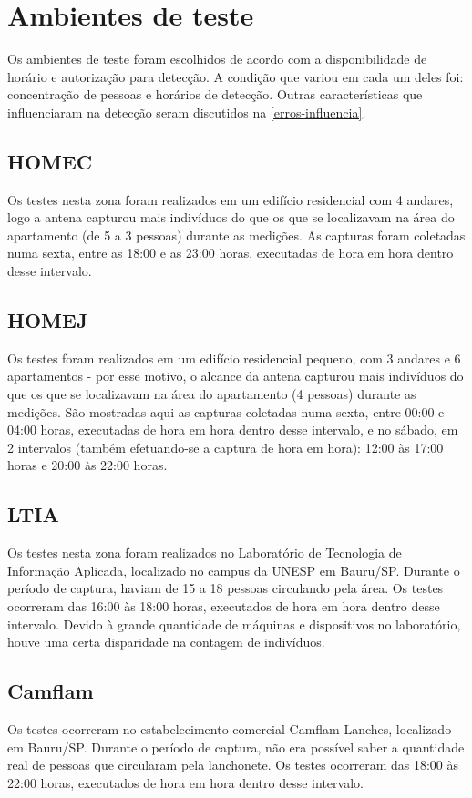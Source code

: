 \section{Ambientes de teste}
Os ambientes de teste foram escolhidos de acordo com a disponibilidade de horário e autorização
para detecção. A condição que variou em cada um deles foi: concentração de pessoas e horários de detecção.
Outras características que influenciaram na detecção seram discutidos na \autoref{erros-influencia}.

\subsection{HOMEC}

Os testes nesta zona foram realizados em um edifício residencial com 4
andares, logo a antena capturou mais indivíduos do que os que se localizavam na área do apartamento (de  5 a 3 pessoas) durante as medições. As capturas foram coletadas numa sexta, entre
as 18:00 e as 23:00 horas, executadas de hora em hora dentro desse intervalo.

\subsection{HOMEJ}
Os testes foram realizados em um edifício residencial pequeno, com 3
andares e 6 apartamentos - por esse motivo, o alcance da antena capturou mais
indivíduos do que os que se localizavam na área do apartamento (4 pessoas)
durante as medições. São mostradas aqui as capturas coletadas numa sexta, entre
00:00 e 04:00 horas, executadas de hora em hora dentro desse intervalo, e no
sábado, em 2 intervalos (também efetuando-se a captura de hora em hora): 12:00
às 17:00 horas e 20:00 às 22:00 horas.

\subsection{LTIA}
Os testes nesta zona foram realizados no Laboratório de Tecnologia de Informação Aplicada, localizado no campus da UNESP em Bauru/SP. Durante o período de captura, haviam de 15 a 18 pessoas circulando pela área.  Os testes ocorreram das 16:00 às 18:00 horas, executados de hora em hora dentro desse intervalo. Devido à grande quantidade de máquinas e dispositivos no laboratório, houve uma certa disparidade na contagem de indivíduos.

\subsection{Camflam}
Os testes ocorreram no estabelecimento comercial Camflam Lanches, localizado em Bauru/SP. Durante o período de captura, não era possível saber a quantidade real de pessoas que circularam pela lanchonete.  Os testes ocorreram das 18:00 às 22:00 horas, executados de hora em hora dentro desse intervalo.

